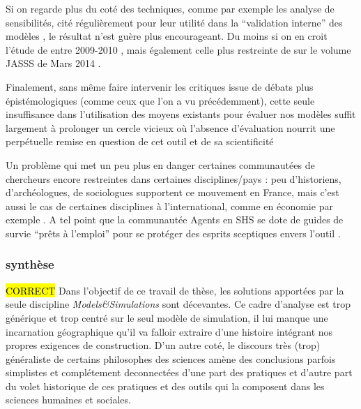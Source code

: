 Si on regarde plus du coté des techniques, comme par exemple les analyse de sensibilités, cité régulièrement pour leur utilité dans la \enquote{validation interne} des modèles \autocite{Amblard2006}, le résultat n'est guère plus encourageant. Du moins si on en croit l'étude de \textcite{Thiele2014} entre 2009-2010 , mais également celle plus restreinte de \textcite{Cottineau2015} sur le volume JASSS de Mars 2014 .

Finalement, sans même faire intervenir les critiques issue de débats plus épistémologiques (comme ceux que l'on a vu précédemment), cette seule insuffisance dans l'utilisation des moyens existants pour évaluer nos modèles suffit largement à prolonger un cercle vicieux où l'absence d'évaluation nourrit une perpétuelle remise en question de cet outil et de sa scientificité

Un problème qui met un peu plus en danger certaines communautées de chercheurs encore restreintes dans certaines disciplines/pays : peu d'historiens, d'archéologues, de sociologues \autocite{Manzo2007} supportent ce mouvement en France, mais c'est aussi le cas de certaines disciplines à l'international, comme en économie par exemple \autocites{Lehtinen2007, Richiardi2006}[220]{Squazzoni2010}[198]{Fagiolo2007}. A tel point que la communautée Agents en SHS se dote de guides de survie \enquote{prêts à l'emploi} pour se protéger des esprits sceptiques envers l'outil \autocite{Waldherr2013}.

\subsubsection{synthèse}

\hl{CORRECT}
Dans l'objectif de ce travail de thèse, les solutions apportées par la seule discipline \textit{Models\&Simulations} sont décevantes. Ce cadre d'analyse est trop générique et trop centré sur le seul modèle de simulation, il lui manque une incarnation géographique qu'il va falloir extraire d'une histoire intégrant nos propres exigences de construction. D'un autre coté, le discours très (trop) généraliste de certains philosophes des sciences amène des conclusions parfois simplistes et complétement deconnectées d'une part des pratiques et d'autre part du volet historique de ces pratiques et des outils qui la composent dans les sciences humaines et sociales.

